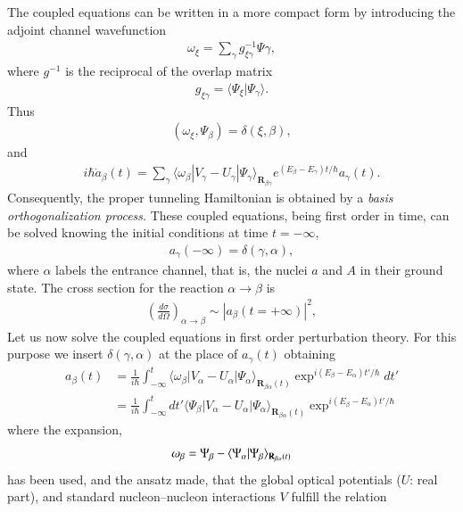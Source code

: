 The coupled equations can be written in a more compact form by introducing the adjoint channel wavefunction 
\begin{align}
\omega_\xi=\sum_{\gamma}g_{\xi\gamma}^{-1}\Psi{\gamma},
\end{align}
where $g^{-1}$ is the reciprocal of the overlap matrix
\begin{align}
g_{\xi\gamma}=\langle\Psi_\xi|\Psi_\gamma\rangle.
\end{align}
Thus
\begin{align}
(\omega_\xi,\Psi_\beta)=\delta(\xi,\beta),
\end{align}
and
\begin{align}
i\hbar\dot a_\beta(t)=\sum_{\gamma}\langle\omega_\beta|V_\gamma-U_\gamma|\Psi_\gamma\rangle_{\mathbf R_{\beta\gamma}}e^{(E_\beta-E_\gamma)t/\hbar}a_\gamma(t).
\end{align}
Consequently, the proper tunneling Hamiltonian is obtained by a \textit{basis orthogonalization process}. These coupled equations, being first order in time, can be solved knowing the initial conditions at time $t=-\infty$,
\begin{align}
a_\gamma(-\infty)=\delta(\gamma,\alpha),
\end{align}
where $\alpha$ labels the entrance channel, that is, the nuclei $a$ and $A$ in their ground state. The cross section for the reaction $\alpha\rightarrow\beta$ is
\begin{align}
\left(\frac{d\sigma}{d\Omega}\right)_{\alpha\rightarrow\beta}\sim\left|a_\beta(t=+\infty)\right|^2,
\end{align}
Let us now  solve the coupled equations in first order perturbation theory. For this purpose we insert $\delta(\gamma,\alpha)$ at the place of $a_\gamma(t)$ obtaining 
\begin{align}\label{eqintroB17}
\nonumber a_\beta(t)&=\frac{1}{i\hbar}\int_{-\infty}^{t}\langle\omega_\beta|V_\alpha-U_\alpha|\Psi_\alpha\rangle_{\mathbf R_{\beta\alpha}(t)}\exp^{i(E_\beta-E_\alpha)t'/\hbar}dt'\\
&=\frac{1}{i\hbar}\int_{-\infty}^{t}dt'\langle\Psi_\beta|V_\alpha-U_\alpha|\Psi_\alpha\rangle_{\mathbf R_{\beta\alpha}(t)}\exp^{i(E_\beta-E_\alpha)t'/\hbar}
\end{align}
where the expansion,
\begin{align}\label{eqintroB18}
\omega_\beta=\Psi_\beta-\langle {\Psi_\alpha|\Psi_\beta} \rangle_{\mathbf R_{\beta\alpha}(t)}
\end{align}
has been used, and the ansatz made, that the
 global optical potentials ($U$: real part), and standard nucleon--nucleon interactions $V$  fulfill the relation
